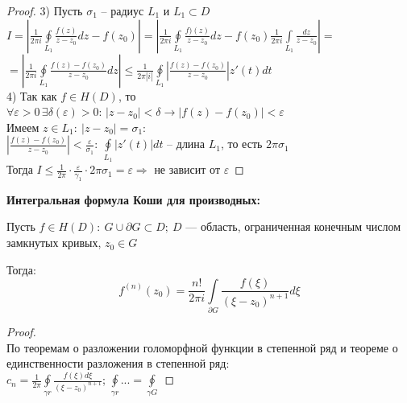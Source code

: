 \begin{proof}
    3) Пусть $\sigma_1$ -- радиус $L_1$ и $L_1 \subset D$\\
    $I = \left| \frac{1}{2\pi i } \oint\limits_{L_1} \frac{f(z)}{z-z_0}dz-f(z_0) \right| = \left| \frac{1}{2\pi i} \oint\limits_{L_1} \frac{f)(z)}{z-z_0}dz - f(z_0)\frac{1}{2\pi i}\int\limits_{L_1} \frac{dz}{z-z_0}\right| = $\\
    $= \left| \frac{1}{2\pi i}\oint\limits_{L_1} \frac{f(z)-f(z_0)}{z-z_0}dz \right| \leq \frac{1}{2\pi |i|} \oint\limits_{L_1}\left| \frac{f(z)-f(z_0)}{z-z_0} \right|z'(t)dt$\\

    4) Так как $f \in H(D)$, то $\forall \varepsilon > 0 \, \exists \delta (\varepsilon)>0: \, |z-z_0|<\delta \rightarrow |f(z)-f(z_0)|<\varepsilon$\\
    Имеем $z\in L_1: \ |z-z_0| = \sigma_1$:\\
    $\left| \frac{f(z)-f(z_0)}{z-z_0} \right|< \frac{\varepsilon}{\sigma_1}: \ \oint\limits_{L_1}|z'(t)|dt$ -- длина $L_1$, то есть $2\pi \sigma_1$\\
    Тогда $I \leq \frac{1}{2\pi}\cdot \frac{\varepsilon}{\gamma_1}\cdot 2\pi \sigma_1 = \varepsilon \Rightarrow$ не зависит от $\varepsilon$ 

\end{proof}
\textbf{Интегральная формула Коши для производных:}

Пусть $f\in H(D): \ G\cup \partial G \subset D; \ D$ --- область, ограниченная конечным числом замкнутых кривых, $z_0 \in G$

Тогда:
$$f^{(n)}(z_0) = \frac{n!}{2\pi i} \int\limits_{\partial G}\frac{f(\xi)}{(\xi-z_0)^{n+1}}d\xi$$

\begin{proof}
    \ \\
    По теоремам о разложении голоморфной функции в степенной ряд и теореме о единственности разложения в степенной ряд:\\
    $c_n=\frac{1}{2\pi} \oint\limits_{\gamma r} \frac{f(\xi)d\xi}{(\xi-z_0)^{n+1}}$; $\oint\limits_{\gamma r}...=\oint\limits_{\gamma G}$
\end{proof}